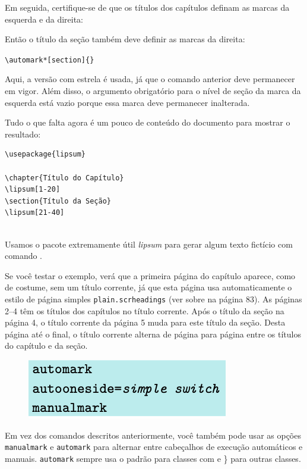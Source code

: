 Em seguida, certifique-se de que os títulos dos capítulos definam as marcas da esquerda e da direita: 

Então o título da seção também deve definir as marcas da direita:

\verb|\automark*[section]{}|

Aqui, a versão com estrela é usada, já que o comando  anterior deve permanecer em vigor. Além disso, o argumento obrigatório para o nível de seção da marca da esquerda está vazio porque essa marca deve permanecer inalterada.

Tudo o que falta agora é um pouco de conteúdo do documento para mostrar o resultado:
\begin{verbatim}
\usepackage{lipsum}

\chapter{Título do Capítulo}
\lipsum[1-20]
\section{Título da Seção}
\lipsum[21-40]
  
\end{verbatim}

Usamos o pacote extremamente útil \textit{lipsum} para gerar algum texto fictício com comando .

Se você testar o exemplo, verá que a primeira página do capítulo aparece, como de costume, sem um título corrente, já que esta página usa automaticamente o estilo de página simples \texttt{plain.scrheadings} (ver sobre  na página 83). As páginas 2–4 têm os títulos dos capítulos no título corrente. Após o título da seção na página 4, o título corrente da página 5 muda para este título da seção. Desta página até o final, o título corrente alterna de página para página entre os títulos do capítulo e da seção.

\begin{figure}[h]
    \centering
    \includegraphics[width=0.5\linewidth]{imagem07.png}
\end{figure}

Em vez dos comandos descritos anteriormente, você também pode usar as opções \texttt{manualmark} e \texttt{automark} para alternar entre cabeçalhos de execução automáticos e manuais. \texttt{automark} sempre usa o padrão  para classes com  e \} para outras classes.

